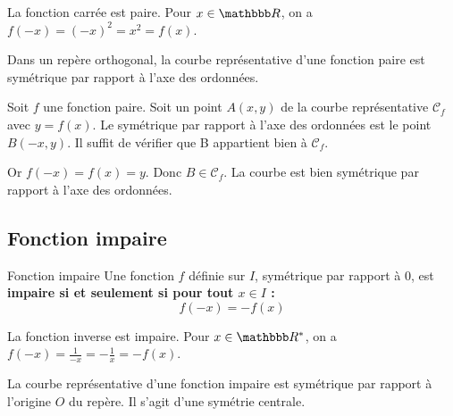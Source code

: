 \documentclass[10pt,a4paper,openany,twoside,prof]{book}
\begin{document}
    \begin{ex}{}{}
    La fonction carrée est paire. Pour $x\in\R$, on a $f(-x)=(-x)^2=x^2=f(x)$.
    \end{ex}

	\begin{prop}{}{}
	Dans un repère orthogonal, la courbe représentative d'une fonction paire est symétrique par rapport à l'axe des ordonnées.
	\end{prop}

    \begin{dem}{}{}
        Soit $f$ une fonction paire. Soit un point $A(x,y)$ de la courbe représentative $\mathcal{C}_f$ avec $y=f(x)$. Le symétrique par rapport à l'axe des ordonnées est le point $B(-x,y)$. Il suffit de vérifier que B appartient bien à $\mathcal{C}_f$.

    Or $f(-x)=f(x)=y$. Donc $B\in\mathcal{C}_f$. La courbe est bien symétrique par rapport à l'axe des ordonnées.
    \end{dem}

	\subsection{Fonction impaire}

	\begin{defi}{Fonction impaire}{}
		Une fonction $f$ définie sur $I$, symétrique par rapport à $0$, est \bf{impaire} si et seulement si pour tout $x \in I$ : $$f(-x)=-f(x)$$
	\end{defi}

    \begin{ex}{}{}
      La fonction inverse est impaire. Pour $x\in\R^*$, on a $f(-x)=\frac{1}{-x}=-\frac{1}{x}=-f(x)$.
    \end{ex}

	\begin{prop}{}{}
	La courbe représentative d'une fonction impaire est symétrique par rapport à l'origine $O$ du repère. Il s'agit d'une symétrie centrale.
	\end{prop}
\end{document}
